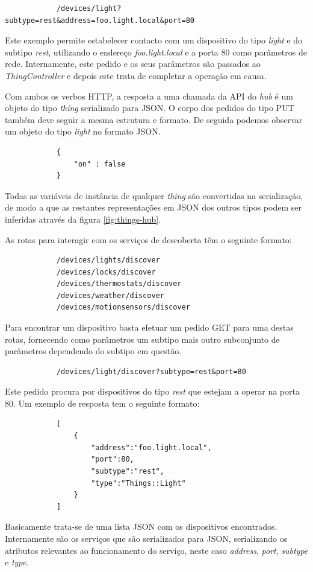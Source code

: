 \begin{verbatim}
            /devices/light?subtype=rest&address=foo.light.local&port=80
\end{verbatim}

Este exemplo permite estabelecer contacto com um dispositivo do tipo \textit{light} e do subtipo \textit{rest}, utilizando o endereço \textit{foo.light.local} e a porta 80 como parâmetros de rede. Internamente, este pedido e os seus parâmetros são passados ao \textit{ThingController} e depois este trata de completar a operação em causa.

Com ambos os verbos HTTP, a resposta a uma chamada da API do \textit{hub} é um objeto do tipo \textit{thing} serializado para JSON. O corpo dos pedidos do tipo PUT também deve seguir a mesma estrutura e formato. De seguida podemos observar um objeto do tipo \textit{light} no formato JSON.

\begin{verbatim}
            {
                "on" : false
            }
\end{verbatim}

Todas as variáveis de instância de qualquer \textit{thing} são convertidas na serialização, de modo a que as restantes representações em JSON dos outros tipos podem ser inferidas através da figura \ref{fig:things-hub}.

As rotas para interagir com os serviços de descoberta têm o seguinte formato:

\begin{verbatim}
            /devices/lights/discover
            /devices/locks/discover
            /devices/thermostats/discover
            /devices/weather/discover
            /devices/motionsensors/discover
\end{verbatim}

Para encontrar um dispositivo basta efetuar um pedido GET para uma destas rotas, fornecendo como parâmetros um subtipo mais outro subconjunto de parâmetros dependendo do subtipo em questão.

\begin{verbatim}
            /devices/light/discover?subtype=rest&port=80
\end{verbatim}

Este pedido procura por dispositivos do tipo \textit{rest} que estejam a operar na porta 80. Um exemplo de resposta tem o seguinte formato:

\begin{verbatim}
            [
                {
                    "address":"foo.light.local",
                    "port":80,
                    "subtype":"rest",
                    "type":"Things::Light"
                }
            ]
\end{verbatim}

Basicamente trata-se de uma lista JSON com os dispositivos encontrados. Internamente são os serviços que são serializados para JSON, serializando os atributos relevantes ao funcionamento do serviço, neste caso \textit{address}, \textit{port}, \textit{subtype} e \textit{type}.